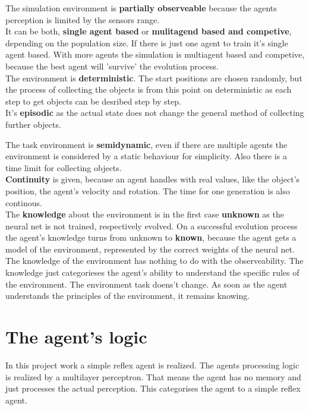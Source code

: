 \documentclass[10pt,a4paper,DIV=11]{scrreprt}
\begin{document}
The simulation environment is \textbf{partially observeable} because the agents perception is limited by the sensors range. \\

It can be both, \textbf{single agent based} or \textbf{mulitagend based and competive}, depending on the population size. If there is just one agent to train it's single agent based. With more agents the simulation is multiagent based and competive, because the best agent will 'survive' the evolution process. \\

The environment is \textbf{deterministic}. The start positions are chosen randomly, but the process of collecting the objects is from this point on deterministic as each step to get objects can be desribed step by step. \\

It's \textbf{episodic} as the actual state does not change the general method of collecting further objects.

The task environment is \textbf{semidynamic}, even if there are multiple agents the environment is considered by a static behaviour for simplicity. Also there is a time limit for collecting objects. \\

\textbf{Continuity} is given, because an agent handles with real values, like the object's position, the agent's velocity and rotation. The time for one generation is also continous. \\

The \textbf{knowledge} about the environment is in the first case \textbf{unknown} as the neural net is not trained, respectively evolved. On a successful evolution process the agent's knowledge turns from unknown to \textbf{known}, because the agent gets a model of the environment, represented by the correct weights of the neural net.
The knowledge of the environment has nothing to do with the observeability. The knowledge just categorieses the agent's ability to understand the  specific rules of the environment. The environment task doens't change. As soon as the agent understands the principles of the environment, it remains knowing. 

\section{The agent's logic}
In this project work a simple reflex agent is realized.
The agents processing logic is realized by a multilayer perceptron. That means the agent has no memory and just processes the actual perception. This categorises the agent to a simple reflex agent.
\end{document}
